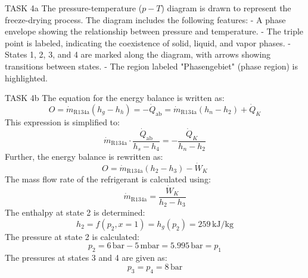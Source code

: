 TASK 4a  
The pressure-temperature (\(p-T\)) diagram is drawn to represent the freeze-drying process. The diagram includes the following features:  
- A phase envelope showing the relationship between pressure and temperature.  
- The triple point is labeled, indicating the coexistence of solid, liquid, and vapor phases.  
- States 1, 2, 3, and 4 are marked along the diagram, with arrows showing transitions between states.  
- The region labeled "Phasengebiet" (phase region) is highlighted.  

TASK 4b  
The equation for the energy balance is written as:  
\[
O = \dot{m}_{\text{R134a}} (h_g - h_h) = -\dot{Q}_{\text{ab}} = \dot{m}_{\text{R134a}} (h_n - h_2) + \dot{Q}_K
\]  
This expression is simplified to:  
\[
\dot{m}_{\text{R134a}} \cdot \frac{\dot{Q}_{\text{ab}}}{h_s - h_4} = -\frac{\dot{Q}_K}{h_n - h_2}
\]  
Further, the energy balance is rewritten as:  
\[
O = \dot{m}_{\text{R134a}} (h_2 - h_3) - \dot{W}_K
\]  
The mass flow rate of the refrigerant is calculated using:  
\[
\dot{m}_{\text{R134a}} = \frac{\dot{W}_K}{h_2 - h_3}
\]  
The enthalpy at state 2 is determined:  
\[
h_2 = f(p_2, x=1) = h_g(p_2) = 259 \, \text{kJ/kg}
\]  
The pressure at state 2 is calculated:  
\[
p_2 = 6 \, \text{bar} - 5 \, \text{mbar} = 5.995 \, \text{bar} = p_1
\]  
The pressures at states 3 and 4 are given as:  
\[
p_3 = p_4 = 8 \, \text{bar}
\]